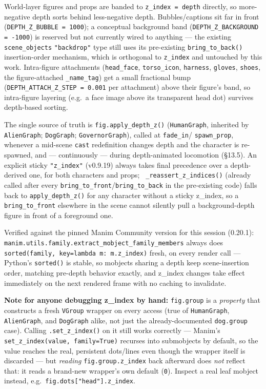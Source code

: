 \documentclass[
  12pt,
  letterpaper,
]{book}
\begin{document}
World-layer figures and props are banded to \texttt{z\_index = depth}
directly, so more-negative depth sorts behind less-negative depth.
Bubbles/captions sit far in front (\texttt{DEPTH\_Z\_BUBBLE = 1000});
a conceptual background band (\texttt{DEPTH\_Z\_BACKGROUND = -1000})
is reserved but not currently wired to anything --- the existing
\texttt{scene\_objects} \texttt{"backdrop"} type still uses its
pre-existing \texttt{bring\_to\_back()} insertion-order mechanism,
which is orthogonal to \texttt{z\_index} and untouched by this work.
Intra-figure attachments (\texttt{head\_face}, \texttt{torso\_icon},
\texttt{harness}, \texttt{gloves}, \texttt{shoes}, the figure-attached
\texttt{\_name\_tag}) get a small fractional bump
(\texttt{DEPTH\_ATTACH\_Z\_STEP = 0.001} per attachment) above their
figure's band, so intra-figure layering (e.g.\ a face image above its
transparent head dot) survives depth-based sorting.

The single source of truth is \texttt{fig.apply\_depth\_z()}
(\texttt{HumanGraph}, inherited by \texttt{AlienGraph};
\texttt{DogGraph}; \texttt{GovernorGraph}), called at \texttt{fade\_in}/
\texttt{spawn\_prop}, whenever a mid-scene \texttt{cast} redefinition
changes depth and the character is re-spawned, and --- continuously
--- during depth-animated locomotion (\S13.5). An explicit sticky
\texttt{"z\_index"} (v0.9.19) always takes final precedence over a
depth-derived one, for both characters and props; \texttt{
\_reassert\_z\_indices()} (already called after every
\texttt{bring\_to\_front}/\texttt{bring\_to\_back} in the pre-existing
code) falls back to \texttt{apply\_depth\_z()} for any character
without a sticky z\_index, so a \texttt{bring\_to\_front} elsewhere in
the scene cannot silently pull a background-depth figure in front of a
foreground one.

Verified against the pinned Manim Community version for this session
(0.20.1): \texttt{manim.utils.family.extract\_mobject\_family\_members}
always does \texttt{sorted(family, key=lambda m: m.z\_index)} fresh, on
every render call --- Python's \texttt{sorted()} is stable, so
mobjects sharing a depth keep scene-insertion order, matching
pre-depth behavior exactly, and z\_index changes take effect
immediately on the next rendered frame with no caching to invalidate.

\textbf{Note for anyone debugging z\_index by hand:}
\texttt{fig.group} is a \emph{property} that constructs a fresh
\texttt{VGroup} wrapper on every access (true of \texttt{HumanGraph},
\texttt{AlienGraph}, and \texttt{DogGraph} alike, not just the
already-documented \texttt{dog.group} case). Calling
\texttt{.set\_z\_index()} on it still works correctly --- Manim's
\texttt{set\_z\_index(value, family=True)} recurses into submobjects by
default, so the value reaches the real, persistent dots/lines even
though the wrapper itself is discarded --- but \emph{reading}
\texttt{fig.group.z\_index} back afterward does \emph{not} reflect
that: it reads a brand-new wrapper's own default (\texttt{0}). Inspect
a real leaf mobject instead, e.g.\ \texttt{fig.dots["head"].z\_index}.
\end{document}

